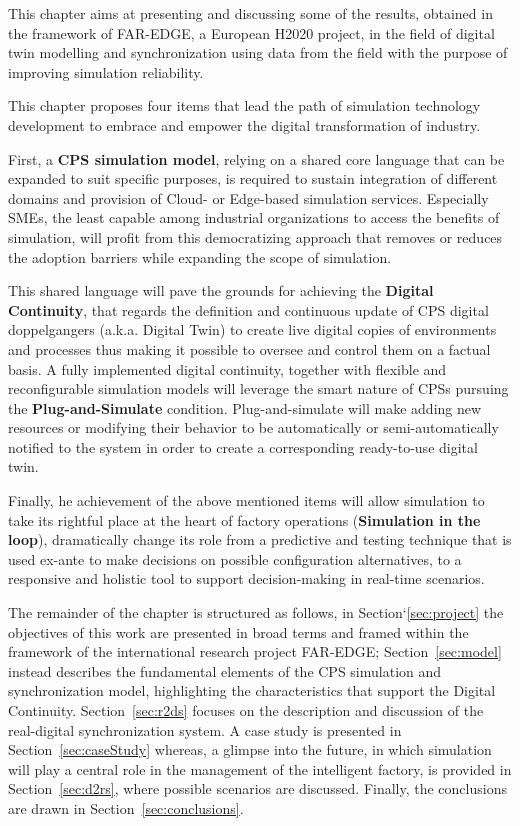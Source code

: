 This chapter aims at presenting and discussing some of the results, obtained in the framework of FAR-EDGE, a European H2020 project, in the field of digital twin modelling and synchronization using data from the field with the purpose of improving simulation reliability. 

This chapter proposes four items that lead the path of simulation technology development to embrace and empower the digital transformation of industry. 

First, a \textbf{CPS simulation model}, relying on a shared core language that can be expanded to suit specific purposes, is required to sustain integration of different domains and provision of Cloud- or Edge-based simulation services. 
Especially SMEs, the least capable among industrial organizations to access the benefits of simulation, will profit from this democratizing approach that removes or reduces the adoption barriers while expanding the scope of simulation.

This shared language will pave the grounds for achieving the \textbf{Digital Continuity}, that regards the definition and continuous update of CPS digital doppelgangers (a.k.a. Digital Twin) to create live digital copies of  environments and processes thus making it possible to oversee and control them on a factual basis.  A fully implemented digital continuity, together with flexible and reconfigurable simulation models will leverage the smart nature of CPSs pursuing the \textbf{Plug-and-Simulate} condition. Plug-and-simulate will make adding new resources or modifying their behavior to be automatically or semi-automatically notified to the system in order to create a corresponding ready-to-use digital twin.

Finally, he achievement of the above mentioned items will allow simulation to take its rightful place at the heart of factory operations (\textbf{Simulation in the loop}),  dramatically change its role from a predictive and testing technique that is used ex-ante to make decisions on possible configuration alternatives, to a responsive and holistic tool to support decision-making in real-time scenarios.



The remainder of the chapter is structured as follows, in Section`\ref{sec:project} the objectives of this work are presented in broad terms and framed within the framework of the international research project FAR-EDGE; Section~\ref{sec:model} instead describes the fundamental elements of the CPS simulation and synchronization model, highlighting the characteristics that support the Digital Continuity. Section~\ref{sec:r2ds} focuses on the description and discussion of the real-digital synchronization system. A case study is presented in Section~\ref{sec:caseStudy} whereas, a glimpse into the future, in which simulation will play a central role in the management of the intelligent factory, is provided in Section~\ref{sec:d2rs}, where possible scenarios are discussed. Finally, the conclusions are drawn in Section~\ref{sec:conclusions}.  






